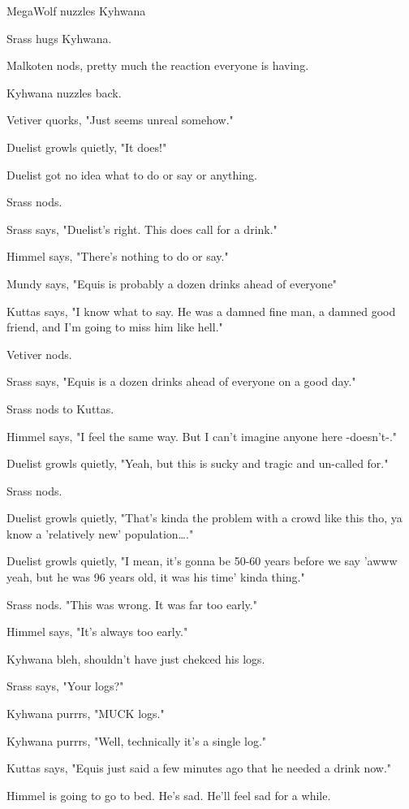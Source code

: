 MegaWolf nuzzles Kyhwana

Srass hugs Kyhwana.

Malkoten nods, pretty much the reaction everyone is having.

Kyhwana nuzzles back.

Vetiver quorks, "Just seems unreal somehow."

Duelist growls quietly, "It does!"

Duelist got no idea what to do or say or anything.

Srass nods.

Srass says, "Duelist's right.  This does call for a drink."

Himmel says, "There's nothing to do or say."

Mundy says, "Equis is probably a dozen drinks ahead of everyone"

Kuttas says, "I know what to say. He was a damned fine man, a damned good friend, and I'm going to miss him like hell."

Vetiver nods.

Srass says, "Equis is a dozen drinks ahead of everyone on a good day."

Srass nods to Kuttas.

Himmel says, "I feel the same way. But I can't imagine anyone here -doesn't-."

Duelist growls quietly, "Yeah, but this is sucky and tragic and un-called for."

Srass nods.

Duelist growls quietly, "That's kinda the problem with a crowd like this tho, ya know a 'relatively new' population\ldots{}."

Duelist growls quietly, "I mean, it's gonna be 50-60 years before we say 'awww yeah, but he was 96 years old, it was his time' kinda thing."

Srass nods.  "This was wrong.  It was far too early."

Himmel says, "It's always too early."

Kyhwana bleh, shouldn't have just chekced his logs.

Srass says, "Your logs?"

Kyhwana purrrs, "MUCK logs."

Kyhwana purrrs, "Well, technically it's a single log."

Kuttas says, "Equis just said a few minutes ago that he needed a drink now."

Himmel is going to go to bed. He's sad. He'll feel sad for a while.

